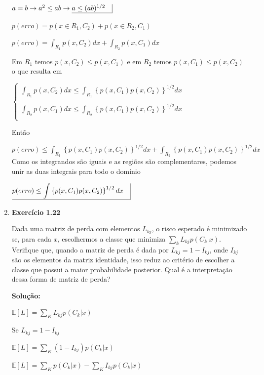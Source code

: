 \begin{enumerate}
$a=b \rightarrow a^2 \leq a b \rightarrow \underline{a \leq (a b)^{1/2} \quad} \vline $

$p(erro)=p(x \in R_1, C_2)+p(x \in R_2, C_1)$ 

$p(erro)= \displaystyle \int_{R_1} p(x, C_2) dx + \int_{R_2} p(x, C_1) dx$ 

Em $R_1$ temos $p(x, C_2) \leq p(x, C_1)$ e em $R_2$ temos $p(x, C_1) \leq p(x, C_2)$ o que resulta em

$\begin{cases}
    \displaystyle \int_{R_1} p(x, C_2) dx \leq \int_{R_1} \left\{p(x, C_1)p(x, C_2)\right\}^{1/2} dx \\
    \\
    \displaystyle \int_{R_2} p(x, C_1) dx \leq \int_{R_2} \left\{p(x, C_1)p(x, C_2)\right\}^{1/2} dx\\
\end{cases}$

Então

$p(erro) \leq \displaystyle \int_{R_1} \left\{p(x, C_1)p(x, C_2)\right\}^{1/2} dx + \int_{R_2} \left\{p(x, C_1)p(x, C_2)\right\}^{1/2} dx$ \\

Como os integrandos são iguais e as regiões são complementares, podemos unir as duas integrais para todo o domínio

$\underline{p(erro) \leq \displaystyle \int \left\{p(x, C_1)p(x, C_2)\right\}^{1/2} dx \quad} \vline $
    

\item \textbf{Exercício 1.22} \par

Dada uma matriz de perda com elementos $L_{kj}$, o risco esperado é minimizado se, para cada $x$, escolhermos a classe que minimiza $\sum_{k}^{}L_{kj}p(C_k | x)$. Verifique que, quando a matriz de perda é dada por $L_{kj} = 1 - I_{kj}$, onde $I_{kj}$ são os elementos da matriz identidade, isso reduz ao critério de escolher a classe que possui a maior probabilidade posterior. Qual é a interpretação dessa forma de matriz de perda?
\newline \par
\textbf{Solução:}

$\mathbb{E}[L]=\sum_{K}L_{kj}p(C_k | x)$

Se $L_{kj}=1-I_{kj}$

$\mathbb{E}[L]=\sum_{K}(1-I_{kj})p(C_k | x)$

$\mathbb{E}[L]=\sum_{K}p(C_k | x) - \sum_{K}I_{kj}p(C_k | x)$


\end{enumerate}
